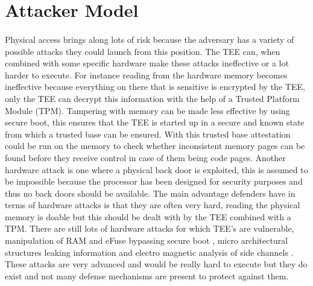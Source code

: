 \documentclass{report}
\begin{document}
\section{Attacker Model}

\paragraph*{}
Physical access brings along lots of risk because the adversary has a variety of possible attacks they could launch from this position. The TEE can, when combined with some specific hardware make these attacks ineffective or a lot harder to execute. For instance reading from the hardware memory becomes ineffective because everything on there that is sensitive is encrypted by the TEE, only the TEE can decrypt this information with the help of a Trusted Platform Module (TPM). Tampering with memory can be made less effective by using secure boot, this ensures that the TEE is started up in a secure and known state from which a trusted base can be ensured. With this trusted base attestation could be run on the memory to check whether inconsistent memory pages can be found before they receive control in case of them being code pages. Another hardware attack is one where a physical back door is exploited, this is assumed to be impossible because the processor has been designed for security purposes and thus no back doors should be available. The main advantage defenders have in terms of hardware attacks is that they are often very hard, reading the physical memory is doable but this should be dealt with by the TEE combined with a TPM. There are still lots of hardware attacks for which TEE's are vulnerable, manipulation of RAM and eFuse bypassing secure boot \cite{GrossMathieu2021BTmi}, micro architectural structures leaking information \cite{RyanKeegan2019HHEE} and electro magnetic analysis of side channels \cite{BukasaSebanjilaKevin2018HTCB}. These attacks are very advanced and would be really hard to execute but they do exist and not many defense mechanisms are present to protect against them.
\end{document}
